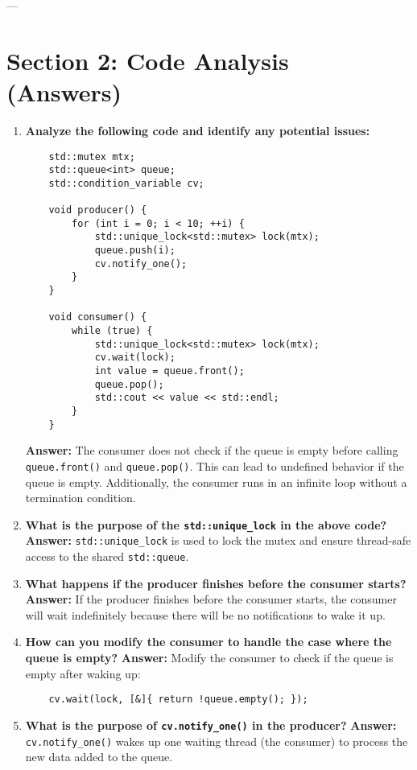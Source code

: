 \documentclass[12pt]{article}
\begin{document}
---

\section*{Section 2: Code Analysis (Answers)}

\begin{enumerate}
    \item \textbf{Analyze the following code and identify any potential issues:}
    \begin{verbatim}
    std::mutex mtx;
    std::queue<int> queue;
    std::condition_variable cv;

    void producer() {
        for (int i = 0; i < 10; ++i) {
            std::unique_lock<std::mutex> lock(mtx);
            queue.push(i);
            cv.notify_one();
        }
    }

    void consumer() {
        while (true) {
            std::unique_lock<std::mutex> lock(mtx);
            cv.wait(lock);
            int value = queue.front();
            queue.pop();
            std::cout << value << std::endl;
        }
    }
    \end{verbatim}
    \textbf{Answer:} The consumer does not check if the queue is empty before calling \texttt{queue.front()} and \texttt{queue.pop()}. This can lead to undefined behavior if the queue is empty. Additionally, the consumer runs in an infinite loop without a termination condition.

    \item \textbf{What is the purpose of the \texttt{std::unique\_lock} in the above code?}
    \textbf{Answer:} \texttt{std::unique\_lock} is used to lock the mutex and ensure thread-safe access to the shared \texttt{std::queue}.

    \item \textbf{What happens if the producer finishes before the consumer starts?}
    \textbf{Answer:} If the producer finishes before the consumer starts, the consumer will wait indefinitely because there will be no notifications to wake it up.

    \item \textbf{How can you modify the consumer to handle the case where the queue is empty?}
    \textbf{Answer:} Modify the consumer to check if the queue is empty after waking up:
    \begin{verbatim}
    cv.wait(lock, [&]{ return !queue.empty(); });
    \end{verbatim}

    \item \textbf{What is the purpose of \texttt{cv.notify\_one()} in the producer?}
    \textbf{Answer:} \texttt{cv.notify\_one()} wakes up one waiting thread (the consumer) to process the new data added to the queue.


\end{enumerate}
\end{document}
